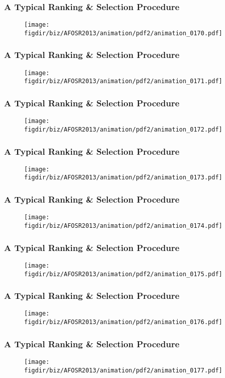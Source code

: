 \documentclass[13pt]{beamer}
\newcommand{\figdir}{../../fig}
\begin{document}
\begin{frame}\frametitle{A Typical Ranking \& Selection Procedure}\begin{figure}\texttt{[image: \\figdir/biz/AFOSR2013/animation/pdf2/animation\_0170.pdf]}\end{figure}\end{frame}
\begin{frame}\frametitle{A Typical Ranking \& Selection Procedure}\begin{figure}\texttt{[image: \\figdir/biz/AFOSR2013/animation/pdf2/animation\_0171.pdf]}\end{figure}\end{frame}
\begin{frame}\frametitle{A Typical Ranking \& Selection Procedure}\begin{figure}\texttt{[image: \\figdir/biz/AFOSR2013/animation/pdf2/animation\_0172.pdf]}\end{figure}\end{frame}
\begin{frame}\frametitle{A Typical Ranking \& Selection Procedure}\begin{figure}\texttt{[image: \\figdir/biz/AFOSR2013/animation/pdf2/animation\_0173.pdf]}\end{figure}\end{frame}
\begin{frame}\frametitle{A Typical Ranking \& Selection Procedure}\begin{figure}\texttt{[image: \\figdir/biz/AFOSR2013/animation/pdf2/animation\_0174.pdf]}\end{figure}\end{frame}
\begin{frame}\frametitle{A Typical Ranking \& Selection Procedure}\begin{figure}\texttt{[image: \\figdir/biz/AFOSR2013/animation/pdf2/animation\_0175.pdf]}\end{figure}\end{frame}
\begin{frame}\frametitle{A Typical Ranking \& Selection Procedure}\begin{figure}\texttt{[image: \\figdir/biz/AFOSR2013/animation/pdf2/animation\_0176.pdf]}\end{figure}\end{frame}
\begin{frame}\frametitle{A Typical Ranking \& Selection Procedure}\begin{figure}\texttt{[image: \\figdir/biz/AFOSR2013/animation/pdf2/animation\_0177.pdf]}\end{figure}\end{frame}
\end{document}
